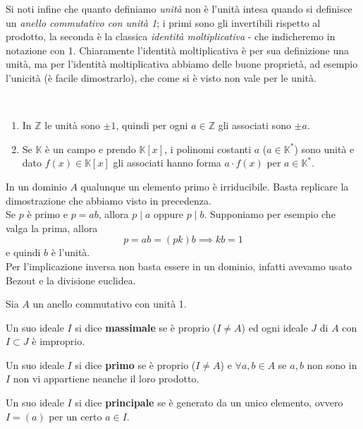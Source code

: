 \begin{osservazione}
\begin{enumerate}
	\end{enumerate}
	Si noti infine che quanto definiamo \textit{unità} non è l'unità intesa quando si definisce un \textit{anello commutativo con unità 1}; i primi sono gli invertibili rispetto al prodotto, la seconda è la classica \textit{identità moltiplicativa} - che indicheremo in notazione con 1. Chiaramente l'identità moltiplicativa è per sua definizione una unità, ma per l'identità moltiplicativa abbiamo delle buone proprietà, ad esempio l'unicità (è facile dimostrarlo), che come si è visto non vale per le unità.
\end{osservazione}
\begin{esempio}\
	\begin{enumerate}
		\item In $\mathbb{Z}$ le unità sono $\pm 1$, quindi per ogni $a \in \mathbb{Z}$ gli associati sono $\pm a$.
		\item Se $\mathbb{K}$ è un campo e prendo $\mathbb{K}[x]$, i polinomi costanti $a$ ($a \in \mathbb{K}^*$) sono unità e dato $f(x) \in \mathbb{K}[x]$ gli associati hanno forma $a\cdot f(x)$ per $a \in \mathbb{K}^*$.
	\end{enumerate}
\end{esempio}
\begin{osservazione} 
	\label{notinD}
	In un dominio $A$ qualunque un elemento primo è irriducibile. Basta replicare la dimostrazione che abbiamo visto in precedenza.\\
	Se $p$ è primo e $p=ab$, allora $p\mid a$ oppure $p\mid b$. Supponiamo per esempio che valga la prima, allora 
	\begin{equation*}
	p=ab=(pk)b \implies kb=1 
	\end{equation*}
	e quindi $b$ è l'unità. \\ 
	Per l'implicazione inversa non basta essere in un dominio, infatti avevamo usato Bezout e la divisione euclidea.
\end{osservazione}
\begin{definizione}
	Sia $A$ un anello commutativo con unità 1.
	\item Un suo ideale $I$ si dice \textbf{massimale} se è proprio ($I \neq A$) ed ogni ideale $J$ di $A$ con $I \subset J$ è improprio.
	\item Un suo ideale $I$ si dice \textbf{primo} se è proprio ($I \neq A$) e $\forall a,b \in A$ se $a,b$ non sono in $I$ non vi appartiene neanche il loro prodotto.
	\item Un suo ideale $I$ si dice \textbf{principale} se è generato da un unico elemento, ovvero $I=(a)$ per un certo $a \in I$.
\end{definizione}
